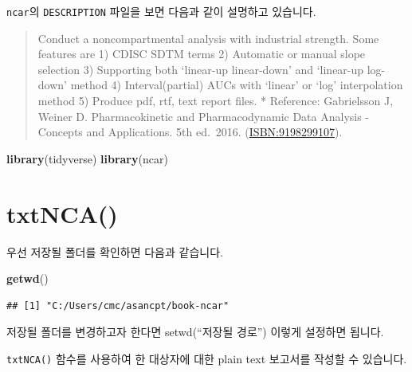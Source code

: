 \documentclass[12pt,]{krantz}
\newenvironment{Shaded}{\begin{snugshade}}{\end{snugshade}}
\newcommand{\DataTypeTok}[1]{\textcolor[rgb]{0.13,0.29,0.53}{#1}}
\newcommand{\DecValTok}[1]{\textcolor[rgb]{0.00,0.00,0.81}{#1}}
\newcommand{\KeywordTok}[1]{\textcolor[rgb]{0.13,0.29,0.53}{\textbf{#1}}}
\newcommand{\NormalTok}[1]{#1}
\newcommand{\OperatorTok}[1]{\textcolor[rgb]{0.81,0.36,0.00}{\textbf{#1}}}
\newcommand{\StringTok}[1]{\textcolor[rgb]{0.31,0.60,0.02}{#1}}
\begin{document}
\texttt{ncar}의 \texttt{DESCRIPTION} 파일을 보면 다음과 같이 설명하고 있습니다.

\begin{quote}
Conduct a noncompartmental analysis with industrial strength.
Some features are
1) CDISC SDTM terms
2) Automatic or manual slope selection
3) Supporting both `linear-up linear-down' and `linear-up log-down' method
4) Interval(partial) AUCs with `linear' or `log' interpolation method
5) Produce pdf, rtf, text report files.
* Reference: Gabrielsson J, Weiner D. Pharmacokinetic and Pharmacodynamic Data Analysis - Concepts and Applications. 5th ed.~2016. (\url{ISBN:9198299107}).
\end{quote}

\begin{Shaded}
\begin{Highlighting}[]
\KeywordTok{library}\NormalTok{(tidyverse)}
\KeywordTok{library}\NormalTok{(ncar)}
\end{Highlighting}
\end{Shaded}

\hypertarget{txtnca}{%
\section{txtNCA()}\label{txtnca}}

우선 저장될 폴더를 확인하면 다음과 같습니다.

\begin{Shaded}
\begin{Highlighting}[]
\KeywordTok{getwd}\NormalTok{()}
\end{Highlighting}
\end{Shaded}

\begin{verbatim}
## [1] "C:/Users/cmc/asancpt/book-ncar"
\end{verbatim}

저장될 폴더를 변경하고자 한다면 setwd(``저장될 경로'') 이렇게 설정하면 됩니다.

\texttt{txtNCA()} 함수를 사용하여 한 대상자에 대한 plain text 보고서를 작성할 수 있습니다.

\begin{Shaded}
\end{Shaded}
\end{document}
